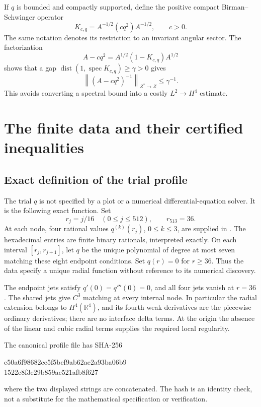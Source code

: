 \documentclass[11pt,a4paper]{article}
\theoremstyle{definition}\newtheorem{definition}[theorem]{Definition}
\theoremstyle{remark}\newtheorem{remark}[theorem]{Remark}
\newcommand{\R}{\mathbb R}
\newcommand{\norm}[1]{\left\|#1\right\|}
\newcommand{\spec}{\operatorname{spec}}
\newcommand{\dist}{\operatorname{dist}}
\newcommand{\file}[1]{\path{#1}}
\begin{document}
If \(q\) is bounded and compactly supported, define the positive compact Birman--Schwinger operator
\begin{equation}\label{eq:bs}
 K_{c,q}=A^{-1/2}(c q^2)A^{-1/2},\qquad c>0.
\end{equation}
The same notation denotes its restriction to an invariant angular sector. The factorization
\begin{equation}\label{eq:factorization}
 A-cq^2=A^{1/2}(1-K_{c,q})A^{1/2}
\end{equation}
shows that a gap \(\dist(1,\spec K_{c,q})\ge\gamma>0\) gives
\begin{equation}\label{eq:inverse}
 \norm{(A-cq^2)^{-1}}_{Z^*\to Z}\le\gamma^{-1}.
\end{equation}
This avoids converting a spectral bound into a costly \(L^2\to H^4\) estimate.

\section{The finite data and their certified inequalities}\label{sec:data}

\subsection{Exact definition of the trial profile}
The trial \(q\) is not specified by a plot or a numerical differential-equation solver. It is the following exact function. Set
\[
 r_j=j/16\quad(0\le j\le512),\qquad r_{513}=36.
\]
At each node, four rational values \(q^{(k)}(r_j)\), \(0\le k\le3\), are supplied in
\file{round2_radial_H4_exact_h1_16.json}.
The hexadecimal entries are finite binary rationals, interpreted exactly. On each interval \([r_j,r_{j+1}]\), let \(q\) be the unique polynomial of degree at most seven matching these eight endpoint conditions. Set \(q(r)=0\) for \(r\ge36\). Thus the data specify a unique radial function without reference to its numerical discovery.

The endpoint jets satisfy \(q'(0)=q'''(0)=0\), and all four jets vanish at \(r=36\). The shared jets give \(C^3\) matching at every internal node. In particular the radial extension belongs to \(H^4(\R^4)\), and its fourth weak derivatives are the piecewise ordinary derivatives; there are no interface delta terms. At the origin the absence of the linear and cubic radial terms supplies the required local regularity.

The canonical profile file has SHA-256
\begin{center}\small\ttfamily
c50a6f98682ce5f5bef9ab62ae2a93ba06b9\\
1522c8f3e29b859ac521afb8f627
\end{center}
where the two displayed strings are concatenated. The hash is an identity check, not a substitute for the mathematical specification or verification.
\end{document}
